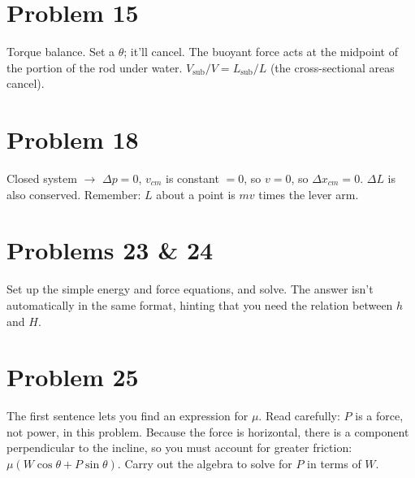 \documentclass[11pt]{article}
\begin{document}
\section*{Problem 15}
Torque balance. Set a $\theta$; it'll cancel.
The buoyant force acts at the midpoint of the portion of the rod under water.
$V_{\text{sub}}/V=L_{\text{sub}}/L$ (the cross-sectional areas cancel).

\begin{center}
\end{center}

\section*{Problem 18}
Closed system $\to$ $\Delta p=0$, $v_{cm}$ is constant $=0$, so $v=0$, so $\Delta x_{cm}=0$. $\Delta L$ is also conserved.
Remember: $L$ about a point is $mv$ times the lever arm.

\section*{Problems 23 \& 24}
Set up the simple energy and force equations, and solve. The answer isn't automatically in the same format, hinting that you need the relation between $h$ and $H$.

\section*{Problem 25}
The first sentence lets you find an expression for $\mu$.
Read carefully: $P$ is a force, not power, in this problem.
Because the force is horizontal, there is a component perpendicular to the incline, so you must account for greater friction: $\mu(W\cos\theta+P\sin\theta)$. Carry out the algebra to solve for $P$ in terms of $W$.
\end{document}
